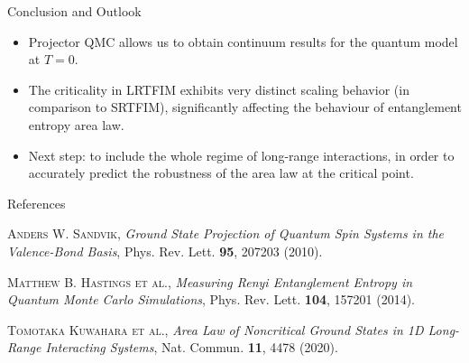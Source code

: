 \documentclass[final,hyperref={pdfpagelabels=false}]{beamer}
\begin{document}
\begin{frame}[t]
\begin{columns}[t]
\begin{column}{.48\textwidth}
\begin{block}{Conclusion and Outlook}
\begin{itemize}
    \item Projector QMC allows us to obtain continuum results for the quantum model at $T = 0$.  
    \item The criticality in LRTFIM exhibits very distinct scaling behavior (in comparison to
SRTFIM), significantly affecting the behaviour of entanglement entropy area law. 
    \item Next step: to include the whole regime of long-range interactions, in order to accurately predict the robustness of the area law at the critical point.  
\end{itemize}
\end{block}

\vspace{-0.05cm}
\begin{block}{References}
\begin{thebibliography}{9}
\textsc{Anders W. Sandvik}, 
\emph{Ground State Projection of Quantum Spin Systems in the Valence-Bond Basis}, 
Phys. Rev. Lett. \textbf{95}, 207203 (2010).

\textsc{Matthew B. Hastings et al.}, 
\emph{Measuring Renyi Entanglement Entropy in Quantum Monte Carlo Simulations}, 
Phys. Rev. Lett. \textbf{104}, 157201 (2014).

\textsc{Tomotaka Kuwahara et al.}, 
\emph{Area Law of Noncritical Ground States in 1D Long-Range Interacting Systems}, 
Nat. Commun. \textbf{11}, 4478 (2020).
\end{thebibliography}
\end{block}

\end{column}

\end{columns}

\end{frame} %
\end{document}
